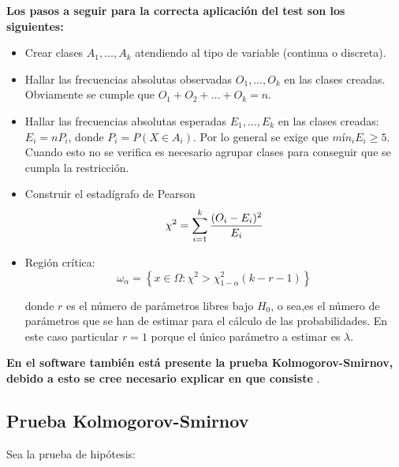 \textbf{Los pasos a seguir para la correcta aplicación del test son los siguientes:}\\
\begin{itemize}
\item Crear clases $A_1, \ldots,A_k$ atendiendo al tipo de variable (continua o discreta).

\item Hallar las frecuencias absolutas observadas $O_1, \ldots,O_k$ en las clases creadas. Obviamente se cumple 
que $O_1 + O_2 +\ldots+ O_k = n$.

\item Hallar las frecuencias absolutas esperadas $E_1, \ldots,E_k$ en las clases creadas: $E_i = nP_i$, donde $P_i = P(X \in A_i)$. Por lo general se exige que $mín_i E_i \geq 5$. Cuando esto no se veriﬁca es necesario agrupar clases para conseguir que se cumpla la restricción.

\item Construir el estadígrafo de Pearson\\

\begin{equation}
\chi^{2} = \sum_{i=1}^{k}{{(O_i - E_i)^{2}} \over E_i}
\end{equation}

\item Región crítica:\\

\begin{equation}
\omega_{\alpha} = \left\{x \in \Omega : \chi^{2} > \chi^{2}_{1-\alpha}(k - r - 1)\right\}
\end{equation}

donde $r$ es el número de parámetros libres bajo $H_0$, o sea,es el número de parámetros que se han de estimar para el cálculo de las probabilidades. En este caso particular $r = 1$ porque el único parámetro a estimar es $\lambda$.
\end{itemize}


\textbf{En el software también está presente la prueba Kolmogorov-Smirnov, debido a esto se cree necesario explicar en que consiste} \cite{DK10}.\\

\subsection{Prueba Kolmogorov-Smirnov}

Sea la prueba de hipótesis:\\

